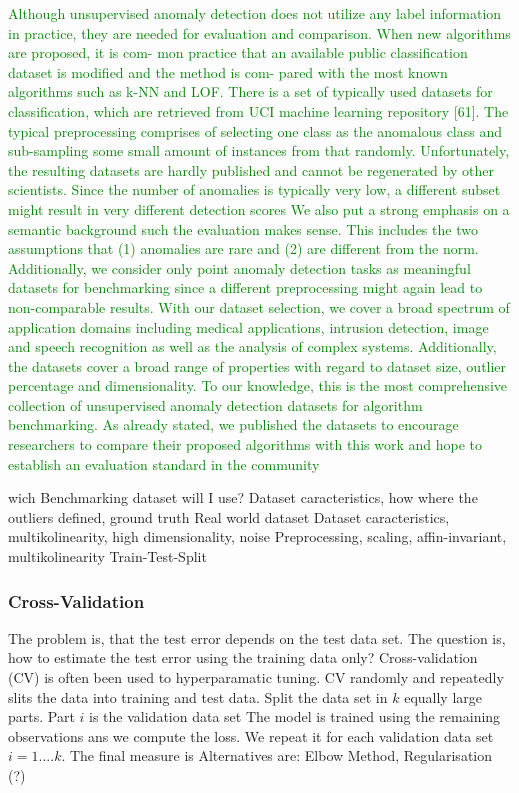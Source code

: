 \textcolor{green}
{Although unsupervised anomaly detection does not utilize any label information in practice,
they are needed for evaluation and comparison. When new algorithms are proposed, it is com-
mon practice that an available public classification dataset is modified and the method is com-
pared with the most known algorithms such as k-NN and LOF. There is a set of typically used
datasets for classification, which are retrieved from UCI machine learning repository [61]. The
typical preprocessing comprises of selecting one class as the anomalous class and sub-sampling
some small amount of instances from that randomly. Unfortunately, the resulting datasets are
hardly published and cannot be regenerated by other scientists. Since the number of anomalies
is typically very low, a different subset might result in very different detection scores
We also put a
strong emphasis on a semantic background such the evaluation makes sense. This includes the
two assumptions that (1) anomalies are rare and (2) are different from the norm. Additionally,
we consider only point anomaly detection tasks as meaningful datasets for benchmarking since
a different preprocessing might again lead to non-comparable results.
With our dataset selection, we cover a
broad spectrum of application domains including medical applications, intrusion detection,
image and speech recognition as well as the analysis of complex systems. Additionally, the
datasets cover a broad range of properties with regard to dataset size, outlier percentage and
dimensionality. To our knowledge, this is the most comprehensive collection of unsupervised
anomaly detection datasets for algorithm benchmarking. As already stated, we published the
datasets to encourage researchers to compare their proposed algorithms with this work and
hope to establish an evaluation standard in the community \citep[p.20]{goldstein2016comparative}}


wich Benchmarking dataset will I use?
Dataset caracteristics, how where the outliers defined, ground truth
Real world dataset
Dataset caracteristics, multikolinearity, high dimensionality, noise
Preprocessing, scaling, affin-invariant, multikolinearity
Train-Test-Split


\subsubsection{Cross-Validation}
The problem is, that the test error depends on the test data  set.
The question is, how to estimate the test error using the training data only?
Cross-validation (CV) is often been used to hyperparamatic tuning.
CV randomly and repeatedly slits the data into training and test data.
Split the data set in $k$ equally large parts.
Part $i$ is the validation data set 
The model is trained using the remaining observations ans we compute the loss.
We repeat it for each validation data set $i = 1. ...  k$.
The final measure is 
Alternatives are: Elbow Method, Regularisation (?) 


